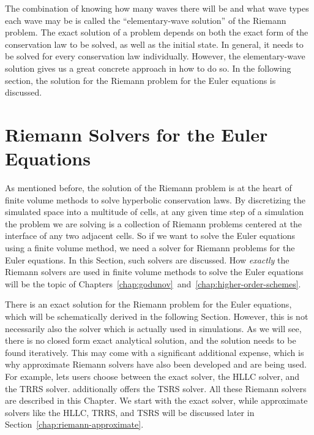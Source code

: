 The combination of knowing how many waves there will be and what wave types each wave may be is
called the ``elementary-wave solution'' of the Riemann problem.
The exact solution of a problem depends on both the exact form of the conservation law to be
solved, as well as the initial state. In general, it needs to be solved for every conservation law
individually. However, the elementary-wave solution gives us a great concrete approach in how to do
so. In the following section, the solution for the Riemann problem for the Euler equations is
discussed.


















\section{Riemann Solvers for the Euler Equations}

As mentioned before, the solution of the Riemann problem is at the heart of finite volume methods
to solve hyperbolic conservation laws. By discretizing the simulated space into a multitude of
cells, at any given time step of a simulation the problem we are solving is a collection of Riemann
problems centered at the interface of any two adjacent cells. So if we want to solve the Euler
equations using a finite volume method, we need a solver for Riemann problems for the Euler
equations. In this Section, such solvers are discussed. How \emph{exactly} the Riemann solvers are
used in finite volume methods to solve the Euler equations will be the topic of
Chapters~\ref{chap:godunov}~and~\ref{chap:higher-order-schemes}.

There is an exact solution for the Riemann problem for the Euler equations, which will be
schematically derived in the following Section. However, this is not necessarily also the
solver which is actually used in simulations. As we will see, there is no closed form exact
analytical solution, and the solution needs to be found iteratively. This may come with a
significant additional expense, which is why approximate Riemann solvers have also been developed
and are being used. For example, \swift lets users choose between the exact solver, the HLLC solver,
and the TRRS solver. \meshhydro additionally offers the TSRS solver. All these Riemann solvers
are described in this Chapter. We start with the exact solver, while approximate solvers like the
HLLC, TRRS, and TSRS will be discussed later in Section~\ref{chap:riemann-approximate}.



